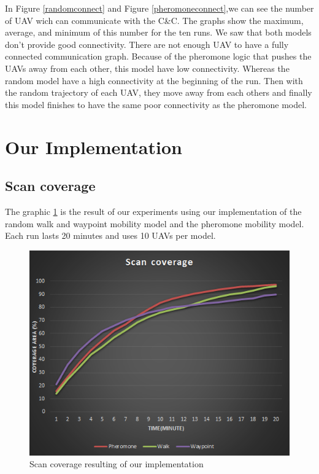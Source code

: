 In Figure \ref{randomconnect} and Figure \ref{pheromoneconnect},we can see the number of UAV wich can communicate with the C\&C.  The  graphs  show the maximum, average, and minimum of this number for the ten runs. We saw that both models don't provide good connectivity. There are not enough UAV to have a fully connected communication graph. Because of the pheromone logic that pushes the UAVs away from each other, this model have low connectivity. Whereas the random model have a high connectivity at the beginning of the run. Then with the random trajectory of each UAV, they move away from each others and finally this model finishes to have the same poor connectivity as the pheromone model.

\section{Our Implementation}

\subsection{Scan coverage}

The graphic \ref{scancoverage} is the result of our experiments using our implementation of the random walk and waypoint mobility model and the pheromone mobility model. Each run lasts 20 minutes and uses 10 UAVs per model.

\begin{figure}[!hbtf]
\centering
   \includegraphics{../images/ScanCoverageResult.png}
\caption{\label{scancoverage} Scan coverage resulting of our implementation}
\end{figure}

